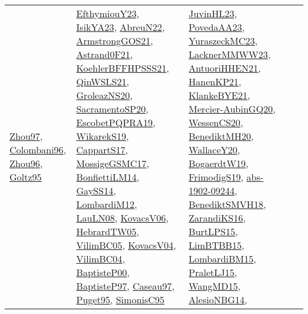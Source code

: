 {\begin{longtable}{llp{6cm}p{6cm}p{6cm}}
\href{articles/Zhou97.pdf}{Zhou97}\cite{Zhou97}, \href{papers/Colombani96.pdf}{Colombani96}\cite{Colombani96}, \href{papers/Zhou96.pdf}{Zhou96}\cite{Zhou96}, \href{papers/Goltz95.pdf}{Goltz95}\cite{Goltz95} & \href{papers/EfthymiouY23.pdf}{EfthymiouY23}\cite{EfthymiouY23}, \href{articles/IsikYA23.pdf}{IsikYA23}\cite{IsikYA23}, \href{articles/AbreuN22.pdf}{AbreuN22}\cite{AbreuN22}, \href{papers/ArmstrongGOS21.pdf}{ArmstrongGOS21}\cite{ArmstrongGOS21}, \href{papers/Astrand0F21.pdf}{Astrand0F21}\cite{Astrand0F21}, \href{articles/KoehlerBFFHPSSS21.pdf}{KoehlerBFFHPSSS21}\cite{KoehlerBFFHPSSS21}, \href{articles/QinWSLS21.pdf}{QinWSLS21}\cite{QinWSLS21}, \href{papers/GroleazNS20.pdf}{GroleazNS20}\cite{GroleazNS20}, \href{articles/SacramentoSP20.pdf}{SacramentoSP20}\cite{SacramentoSP20}, \href{articles/EscobetPQPRA19.pdf}{EscobetPQPRA19}\cite{EscobetPQPRA19}, \href{articles/WikarekS19.pdf}{WikarekS19}\cite{WikarekS19}, \href{papers/CappartS17.pdf}{CappartS17}\cite{CappartS17}, \href{papers/MossigeGSMC17.pdf}{MossigeGSMC17}\cite{MossigeGSMC17}, \href{papers/BonfiettiLM14.pdf}{BonfiettiLM14}\cite{BonfiettiLM14}, \href{papers/GaySS14.pdf}{GaySS14}\cite{GaySS14}, \href{articles/LombardiM12.pdf}{LombardiM12}\cite{LombardiM12}, \href{papers/LauLN08.pdf}{LauLN08}\cite{LauLN08}, \href{papers/KovacsV06.pdf}{KovacsV06}\cite{KovacsV06}, \href{papers/HebrardTW05.pdf}{HebrardTW05}\cite{HebrardTW05}, \href{articles/VilimBC05.pdf}{VilimBC05}\cite{VilimBC05}, \href{papers/KovacsV04.pdf}{KovacsV04}\cite{KovacsV04}, \href{papers/VilimBC04.pdf}{VilimBC04}\cite{VilimBC04}, \href{articles/BaptisteP00.pdf}{BaptisteP00}\cite{BaptisteP00}, \href{papers/BaptisteP97.pdf}{BaptisteP97}\cite{BaptisteP97}, \href{papers/Caseau97.pdf}{Caseau97}\cite{Caseau97}, \href{papers/Puget95.pdf}{Puget95}\cite{Puget95}, \href{papers/SimonisC95.pdf}{SimonisC95}\cite{SimonisC95} & \href{papers/JuvinHL23.pdf}{JuvinHL23}\cite{JuvinHL23}, \href{papers/PovedaAA23.pdf}{PovedaAA23}\cite{PovedaAA23}, \href{papers/YuraszeckMC23.pdf}{YuraszeckMC23}\cite{YuraszeckMC23}, \href{articles/LacknerMMWW23.pdf}{LacknerMMWW23}\cite{LacknerMMWW23}, \href{papers/AntuoriHHEN21.pdf}{AntuoriHHEN21}\cite{AntuoriHHEN21}, \href{papers/HanenKP21.pdf}{HanenKP21}\cite{HanenKP21}, \href{papers/KlankeBYE21.pdf}{KlankeBYE21}\cite{KlankeBYE21}, \href{papers/Mercier-AubinGQ20.pdf}{Mercier-AubinGQ20}\cite{Mercier-AubinGQ20}, \href{papers/WessenCS20.pdf}{WessenCS20}\cite{WessenCS20}, \href{articles/BenediktMH20.pdf}{BenediktMH20}\cite{BenediktMH20}, \href{articles/WallaceY20.pdf}{WallaceY20}\cite{WallaceY20}, \href{papers/BogaerdtW19.pdf}{BogaerdtW19}\cite{BogaerdtW19}, \href{papers/FrimodigS19.pdf}{FrimodigS19}\cite{FrimodigS19}, \href{articles/abs-1902-09244.pdf}{abs-1902-09244}\cite{abs-1902-09244}, \href{papers/BenediktSMVH18.pdf}{BenediktSMVH18}\cite{BenediktSMVH18}, \href{articles/ZarandiKS16.pdf}{ZarandiKS16}\cite{ZarandiKS16}, \href{papers/BurtLPS15.pdf}{BurtLPS15}\cite{BurtLPS15}, \href{papers/LimBTBB15.pdf}{LimBTBB15}\cite{LimBTBB15}, \href{papers/LombardiBM15.pdf}{LombardiBM15}\cite{LombardiBM15}, \href{papers/PraletLJ15.pdf}{PraletLJ15}\cite{PraletLJ15}, \href{articles/WangMD15.pdf}{WangMD15}\cite{WangMD15}, \href{papers/AlesioNBG14.pdf}{AlesioNBG14}\cite{AlesioNBG14}, 
\end{longtable}}
